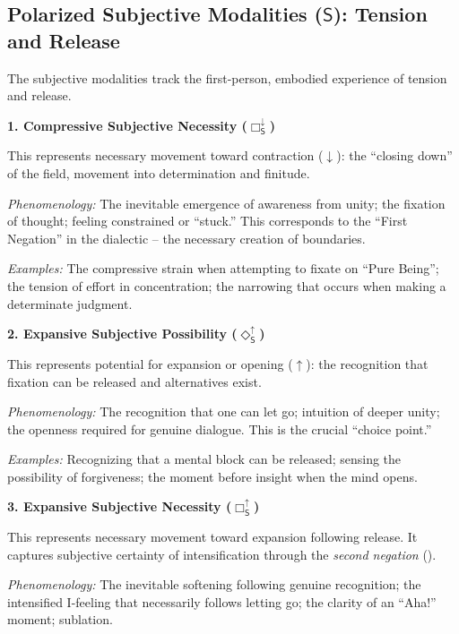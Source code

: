 \documentclass[12pt]{book}
\newcommand{\SBoxUp}{\Box_{\mathsf{S}}^{\uparrow}}
\newcommand{\SBoxDown}{\Box_{\mathsf{S}}^{\downarrow}}
\newcommand{\SDiaUp}{\Diamond_{\mathsf{S}}^{\uparrow}}
\newcommand{\sublate}[1]{\cancel{#1}}
\begin{document}
\subsection{Polarized Subjective Modalities ($\mathsf{S}$): Tension and Release}

The subjective modalities track the first-person, embodied experience of tension and release.

\bigskip

\noindent\textbf{1. Compressive Subjective Necessity ($\SBoxDown$)}

This represents necessary movement toward contraction ($\downarrow$): the ``closing down'' of the field, movement into determination and finitude.

\textit{Phenomenology:} The inevitable emergence of awareness from unity; the fixation of thought; feeling constrained or ``stuck.'' This corresponds to the ``First Negation'' in the dialectic -- the necessary creation of boundaries.

\textit{Examples:} The compressive strain when attempting to fixate on ``Pure Being''; the tension of effort in concentration; the narrowing that occurs when making a determinate judgment.

\bigskip

\noindent\textbf{2. Expansive Subjective Possibility ($\SDiaUp$)}

This represents potential for expansion or opening ($\uparrow$): the recognition that fixation can be released and alternatives exist.

\textit{Phenomenology:} The recognition that one can let go; intuition of deeper unity; the openness required for genuine dialogue. This is the crucial ``choice point.''

\textit{Examples:} Recognizing that a mental block can be released; sensing the possibility of forgiveness; the moment before insight when the mind opens.

\bigskip

\noindent\textbf{3. Expansive Subjective Necessity ($\SBoxUp$)}

This represents necessary movement toward expansion following release. It captures subjective certainty of intensification through the \textit{second negation} (\sublate{no}).

\textit{Phenomenology:} The inevitable softening following genuine recognition; the intensified I-feeling that necessarily follows letting go; the clarity of an ``Aha!'' moment; sublation.
\end{document}
